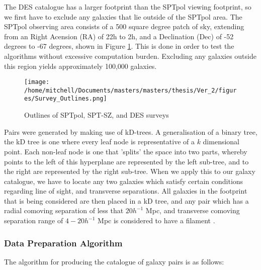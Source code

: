 \par The DES catalogue has a larger footprint than the SPTpol viewing footprint, so we first have to exclude any galaxies that lie outside of the SPTpol area. The SPTpol observing area consists of a 500 square degree patch of sky, extending from an Right Acension (RA) of 22h to 2h, and a Declination (Dec) of -52 degrees to -67 degrees, shown in Figure \ref{fig:surveys}. This is done in order to test the algorithms without excessive computation burden. Excluding any galaxies outside this region yields approximately 100,000 galaxies. 

\begin{figure}[H]
\centering 
\texttt{[image: /home/mitchell/Documents/masters/masters/thesis/Ver\_2/figures/Survey\_Outlines.png]}
\caption{Outlines of SPTpol, SPT-SZ, and DES surveys}
\label{fig:surveys}
\end{figure}

Pairs were generated by making use of kD-trees. A generalisation of a binary tree, the kD tree is one where every leaf node is representative of a $k$ dimensional point. Each non-leaf node is one that 'splits' the space into two parts, whereby points to the left of this hyperplane are represented by the left sub-tree, and to the right are represented by the right sub-tree. When we apply this to our galaxy catalogue, we have to locate any two galaxies which satisfy certain conditions regarding line of sight, and transverse separations. All galaxies in the footprint that is being considered are then placed in a kD tree, and any pair which has a radial comoving separation of less that $20 h^{-1} $ Mpc, and transverse comoving separation range of $4 - 20 h^{-1} $ Mpc is considered to have a filament \citep{2016MNRAS.457.2391C,2005MNRAS.359..272C}.

\subsubsection{Data Preparation Algorithm}
\par The algorithm for producing the catalogue of galaxy pairs is as follows:

